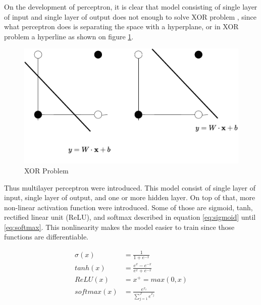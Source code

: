    On the development of perceptron, it is clear that model
    consisting of single layer of input and single layer of output
    does not enough to solve XOR problem
    \citep{Goodfellow-et-al-2016}, since what perceptron does is
    separating the space with a hyperplane, or in XOR problem a
    hyperline as shown on figure \ref{fig:xor}. 
    \begin{figure}
        \centering
        \includegraphics[width=.7\linewidth]{images/xor.pdf}
        \caption{XOR Problem}
        \label{fig:xor}
    \end{figure}
    Thus multilayer perceptron were introduced. This model consist of
    single layer of input, single layer of output, and one or more
    hidden layer. On top of that, more non-linear activation function
    were introduced. Some of those are sigmoid, tanh, rectified linear
    unit (ReLU), and softmax described in equation \ref{eq:sigmoid}
    until \ref{eq:softmax}. This nonlinearity makes the model easier
    to train since those functions are differentiable.

    \begin{align}
        \label{eq:sigmoid}
        \sigma(x) &= \frac{1}{1+e^{-x}} \\
        \label{eq:tanh}
        tanh(x) &= \frac{e^x-e^{-x}}{e^x + e^{-x}}\\
        \label{eq:relu}
        ReLU(x) &= x^+ = max(0, x)\\
        \label{eq:softmax}
        softmax(x) &= \frac{e^{x_i}}{\sum_{j=1}^J e^{x_j}}
    \end{align}

